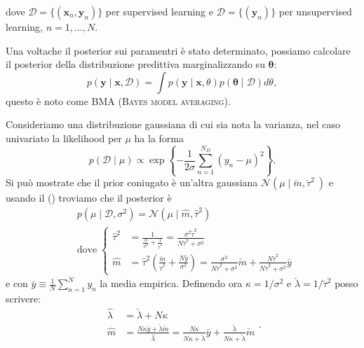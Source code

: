 \documentclass[10pt]{article}
\renewcommand{\vec}[1]{\boldsymbol{#1}}
\newcommand{\im}[1]{\textsc{#1}}
\newcommand{\cond}{\mid}
\newcommand{\Crefn}[1]{\Cref{#1} (\nameref{#1})}
\theoremstyle{definition}
\begin{document}
    dove \(\mathcal{D} = \{ \left( \vec{x}_n, \vec{y}_n \right) \} \) per supervised learning
    e \(\mathcal{D} = \{ \left( \vec{y}_n \right) \} \) per unsupervised learning, \(n = 1,\ldots, N \).

    Una voltache il posterior sui paramentri è stato determinato, possiamo calcolare il posterior
    della distribuzione predittiva marginalizzando su \(\vec{\theta}\):
    \begin{equation}
        p \left( \vec{y}\cond\vec{x}, \mathcal{D} \right) = \int p \left( \vec{y}\cond\vec{x}, \theta \right) p \left( \vec{\theta}\cond\mathcal{D} \right) d\theta,
    \end{equation}
    questo è noto come BMA (\im{Bayes model averaging}).

    Consideriamo una distribuzione gaussiana di cui sia nota la varianza, nel caso univariato la
    likelihood per \(\mu\) ha la forma
    \begin{equation}
        p \left( \mathcal{D}\cond\mu \right) \propto \exp \left\{ - \frac{1}{2\sigma} \sum_{n=1}^{N_D} \left( y_n - \mu \right)^2 \right\}.
    \end{equation}
    Si può mostrate che il prior coniugato è un'altra gaussiana
    \(\mathcal{N}\left( \mu\cond\check{m}, \check{\tau}^2 \ \right)\) e usando il \Crefn{teo:bayes} troviamo che il
    posterior è
    \begin{equation}
        \begin{split}
            &p \left( \mu\cond\mathcal{D}, \sigma^2 \right) = \mathcal{N} \left( \mu\cond\hat{m}, \hat{\tau}^2 \right) \\
            &\text{dove}\;
                \left\{\begin{array}{ll}
                    \hat{\tau}^2 &= \frac{1}{\frac{N}{\sigma^2} + \frac{1}{\check{\tau}^2}} = \frac{\sigma^2\check{\tau}^2}{N\check{\tau}^2 + \sigma^2} \\
                    \hat{m} &= \hat{\tau}^2 \left( \frac{\check{m}}{\check{\tau}^2} + \frac{N\bar{y}}{\sigma^2} \right) = \frac{\sigma^2}{N\check{\tau}^2 + \sigma^2}\check{m} + \frac{N\check{\tau}^2}{N\check{\tau}^2 + \sigma^2}\bar{y}                    
                \end{array}\right.
        \end{split}
    \end{equation}
    e con \(\bar{y}\equiv\frac{1}{N}\sum_{n=1}^N y_n\) la media empirica.
    Definendo ora \(\kappa = 1/\sigma^2\) e \(\check{\lambda} = 1/\check{\tau}^2\) posso scrivere:
    \begin{equation}
        \begin{split}
            \hat{\lambda} &= \check{\lambda} + N\kappa \\
            \hat{m} &= \frac{N\kappa\bar{y} + \check{\lambda}\check{m}}{\hat{\lambda}} = \frac{N\kappa}{N\kappa + \check{\lambda}}\bar{y} + \frac{\check{\lambda}}{N\kappa + \check{\lambda}}\check{m}
        \end{split}.
    \end{equation}
\end{document}
